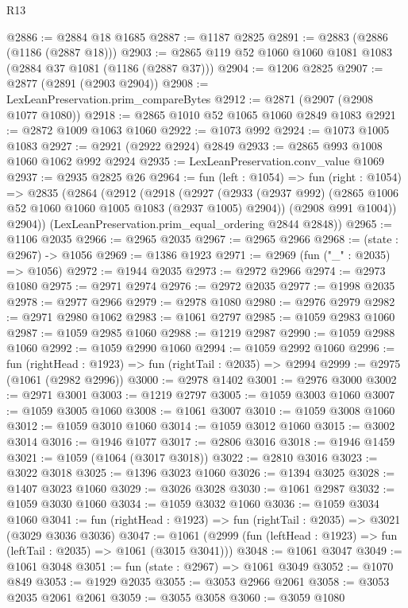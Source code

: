 \begin{lexlean}{R13}
\begin{coremodule}
@2886 := @2884 @18 @1685
@2887 := @1187 @2825
@2891 := @2883 (@2886 (@1186 (@2887 @18)))
@2903 := @2865 @119 @52 @1060 @1060 @1081 @1083 (@2884 @37 @1081 (@1186 (@2887 @37)))
@2904 := @1206 @2825
@2907 := @2877 (@2891 (@2903 @2904))
@2908 := LexLeanPreservation.prim_compareBytes
@2912 := @2871 (@2907 (@2908 @1077 @1080))
@2918 := @2865 @1010 @52 @1065 @1060 @2849 @1083
@2921 := @2872 @1009 @1063 @1060
@2922 := @1073 @992
@2924 := @1073 @1005 @1083
@2927 := @2921 (@2922 @2924) @2849
@2933 := @2865 @993 @1008 @1060 @1062 @992 @2924
@2935 := LexLeanPreservation.conv_value @1069
@2937 := @2935 @2825 @26
@2964 := fun (left : @1054) =>
  fun (right : @1054) =>
  @2835
    (@2864
      (@2912
        (@2918
          (@2927
            (@2933 (@2937 @992) (@2865 @1006 @52 @1060 @1060 @1005 @1083 (@2937 @1005) @2904))
            (@2908 @991 @1004))
          @2904))
      (LexLeanPreservation.prim_equal_ordering @2844 @2848))
@2965 := @1106 @2035
@2966 := @2965 @2035
@2967 := @2965 @2966
@2968 := (state : @2967) -> @1056
@2969 := @1386 @1923
@2971 := @2969 (fun ("_" : @2035) => @1056)
@2972 := @1944 @2035
@2973 := @2972 @2966
@2974 := @2973 @1080
@2975 := @2971 @2974
@2976 := @2972 @2035
@2977 := @1998 @2035
@2978 := @2977 @2966
@2979 := @2978 @1080
@2980 := @2976 @2979
@2982 := @2971 @2980 @1062
@2983 := @1061 @2797
@2985 := @1059 @2983 @1060
@2987 := @1059 @2985 @1060
@2988 := @1219 @2987
@2990 := @1059 @2988 @1060
@2992 := @1059 @2990 @1060
@2994 := @1059 @2992 @1060
@2996 := fun (rightHead : @1923) => fun (rightTail : @2035) => @2994
@2999 := @2975 (@1061 (@2982 @2996))
@3000 := @2978 @1402
@3001 := @2976 @3000
@3002 := @2971 @3001
@3003 := @1219 @2797
@3005 := @1059 @3003 @1060
@3007 := @1059 @3005 @1060
@3008 := @1061 @3007
@3010 := @1059 @3008 @1060
@3012 := @1059 @3010 @1060
@3014 := @1059 @3012 @1060
@3015 := @3002 @3014
@3016 := @1946 @1077
@3017 := @2806 @3016
@3018 := @1946 @1459
@3021 := @1059 (@1064 (@3017 @3018))
@3022 := @2810 @3016
@3023 := @3022 @3018
@3025 := @1396 @3023 @1060
@3026 := @1394 @3025
@3028 := @1407 @3023 @1060
@3029 := @3026 @3028
@3030 := @1061 @2987
@3032 := @1059 @3030 @1060
@3034 := @1059 @3032 @1060
@3036 := @1059 @3034 @1060
@3041 := fun (rightHead : @1923) => fun (rightTail : @2035) => @3021 (@3029 @3036 @3036)
@3047 := @1061 (@2999 (fun (leftHead : @1923) => fun (leftTail : @2035) => @1061 (@3015 @3041)))
@3048 := @1061 @3047
@3049 := @1061 @3048
@3051 := fun (state : @2967) => @1061 @3049
@3052 := @1070 @849
@3053 := @1929 @2035
@3055 := @3053 @2966 @2061
@3058 := @3053 @2035 @2061 @2061
@3059 := @3055 @3058
@3060 := @3059 @1080

\end{coremodule}
\end{lexlean}
